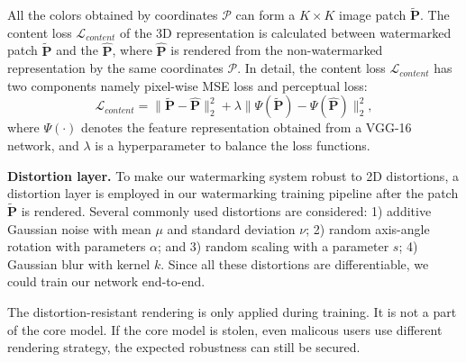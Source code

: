 \documentclass[10pt,twocolumn,letterpaper]{article}
\begin{document}
All the colors obtained by  coordinates $\mathcal{P}$ can form a $K\times K$ image patch $\widetilde{\mathbf{P}}$. The content loss $\mathcal{L}_{content}$ of the 3D representation is calculated between watermarked patch $\widetilde{\mathbf{P}}$ and the $\hat{\mathbf{P}}$, where $\hat{\mathbf{P}}$ is rendered from the non-watermarked representation by the same coordinates $\mathcal{P}$.
In detail, the content loss $\mathcal{L}_{content}$ has two components namely pixel-wise MSE loss and perceptual loss:
\begin{equation}
  \mathcal{L}_{content} = \|\widetilde{\mathbf{P}}-\hat{\mathbf{P}}\|_2^2 + \lambda\|\Psi(\widetilde{\mathbf{P}}) - \Psi(\hat{\mathbf{P}})\|_2^2,
  \label{eq:content}
\end{equation}
where $\Psi(\cdot)$ denotes the feature representation obtained from a VGG-16 network, and $\lambda$ is a hyperparameter to balance the loss functions. 

\noindent\textbf{Distortion layer.}
To make our watermarking system robust to 2D distortions, a distortion layer is employed in our watermarking training pipeline after the patch $\widetilde{\mathbf{P}}$ is rendered. Several commonly used distortions are considered: 1) additive Gaussian noise with mean $\mu$ and standard deviation $\nu$; 2) random axis-angle rotation with parameters $\alpha$; and 3) random scaling with a parameter $s$; 4) Gaussian blur with kernel $k$. Since all these distortions are differentiable, we could train our network end-to-end. 

The distortion-resistant rendering is only applied during training. It is not a part of the core model. If the core model is stolen, even malicous users use different rendering strategy, the expected robustness can still be secured.


\end{document}
